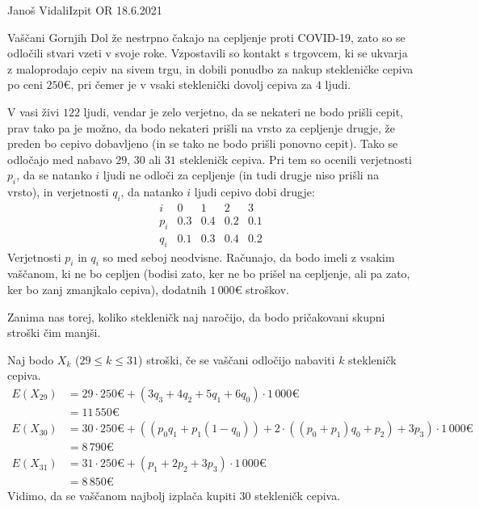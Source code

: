 \begin{naloga}{Janoš Vidali}{Izpit OR 18.6.2021}
\begin{vprasanje}
Vaščani Gornjih Dol že nestrpno čakajo na cepljenje proti COVID-19,
zato so se odločili stvari vzeti v svoje roke.
Vzpostavili so kontakt s trgovcem,
ki se ukvarja z maloprodajo cepiv na sivem trgu,
in dobili ponudbo za nakup stekleničke cepiva po ceni $250 €$,
pri čemer je v vsaki steklenički dovolj cepiva za $4$ ljudi.

V vasi živi $122$ ljudi,
vendar je zelo verjetno, da se nekateri ne bodo prišli cepit,
prav tako pa je možno, da bodo nekateri prišli na vrsto za cepljenje drugje,
že preden bo cepivo dobavljeno (in se tako ne bodo prišli ponovno cepit).
Tako se odločajo med nabavo $29$, $30$ ali $31$ stekleničk cepiva.
Pri tem so ocenili verjetnosti $p_i$,
da se natanko $i$ ljudi ne odloči za cepljenje
(in tudi drugje niso prišli na vrsto),
in verjetnosti $q_i$, da natanko $i$ ljudi cepivo dobi drugje:
$$
\begin{array}{c|cccc}
i & 0 & 1 & 2 & 3 \\ \hline
p_i & 0.3 & 0.4 & 0.2 & 0.1 \\
q_i & 0.1 & 0.3 & 0.4 & 0.2
\end{array}
$$
Verjetnosti $p_i$ in $q_i$ so med seboj neodvisne.
Računajo, da bodo imeli z vsakim vaščanom, ki ne bo cepljen
(bodisi zato, ker ne bo prišel na cepljenje,
ali pa zato, ker bo zanj zmanjkalo cepiva),
dodatnih $1\,000 €$ stroškov.

Zanima nas torej, koliko stekleničk naj naročijo,
da bodo pričakovani skupni stroški čim manjši.
\end{vprasanje}

\begin{odgovor}
Naj bodo $X_k$ ($29 \le k \le 31$) stroški,
če se vaščani odločijo nabaviti $k$ stekleničk cepiva.
\begin{align*}
E(X_{29}) &= 29 \cdot 250 € + (3 q_3 + 4 q_2 + 5 q_1 + 6 q_0) \cdot 1\,000 € \\
&= 11\,550 € \\
E(X_{30}) &= 30 \cdot 250 € + ((p_0 q_1 + p_1 (1 - q_0)) + 2 \cdot ((p_0 + p_1) q_0 + p_2) + 3 p_3) \cdot 1\,000 € \\
&= 8\,790 € \\
E(X_{31}) &= 31 \cdot 250 € + (p_1 + 2 p_2 + 3 p_3) \cdot 1\,000 € \\
&= 8\,850 €
\end{align*}
Vidimo, da se vaščanom najbolj izplača kupiti $30$ stekleničk cepiva.
\end{odgovor}
\end{naloga}
